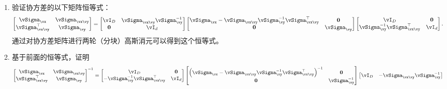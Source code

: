 \documentclass[../../book-main.tex]{subfiles}
\begin{document}
\begin{exercise}
  \begin{enumerate}
    \item 验证协方差的以下矩阵恒等式：
      \begin{equation}\label{eq:gaussian-conditional-covariance-block}
        \begin{bmatrix}
          \vSigma_{\vx} & \vSigma_{\vx\vy} \\
          \vSigma_{\vx\vy}^\top & \vSigma_{\vy}
        \end{bmatrix}
        =
        \begin{bmatrix}
          \vI_D & \vSigma_{\vx\vy}\vSigma_{\vy}^{-1} \\
          \Zero & \vI_d
        \end{bmatrix}
        \begin{bmatrix}
          \vSigma_{\vx} - \vSigma_{\vx\vy} \vSigma_{\vy}^{-1}
          \vSigma_{\vx\vy}^{\top} & \Zero \\
          \Zero & \vSigma_{\vy}
        \end{bmatrix}
        \begin{bmatrix}
          \vI_D & \Zero\\
          \vSigma_{\vy}^{-1}\vSigma_{\vx\vy}^\top & \vI_d
        \end{bmatrix}.
      \end{equation}
      通过对协方差矩阵进行两轮（分块）高斯消元可以得到这个恒等式。
    \item 基于前面的恒等式，证明
      \begin{equation}\label{eq:gaussian-conditional-covariance-inverse-block}
        \begin{bmatrix}
          \vSigma_{\vx} & \vSigma_{\vx\vy} \\
          \vSigma_{\vx\vy}^\top & \vSigma_{\vy}
        \end{bmatrix}^{-1}
        =
        \begin{bmatrix}
          \vI_D & \Zero\\
          -\vSigma_{\vy}^{-1}\vSigma_{\vx\vy}^\top & \vI_d
        \end{bmatrix}
        \begin{bmatrix}
          \left(\vSigma_{\vx} - \vSigma_{\vx\vy} \vSigma_{\vy}^{-1}
          \vSigma_{\vx\vy}^{\top}\right)^{-1} & \Zero \\
          \Zero & \vSigma_{\vy}^{-1}
        \end{bmatrix}
        \begin{bmatrix}
          \vI_D & -\vSigma_{\vx\vy}\vSigma_{\vy}^{-1} \\

\end{bmatrix}
\end{equation}
\end{enumerate}
\end{exercise}
\end{document}
